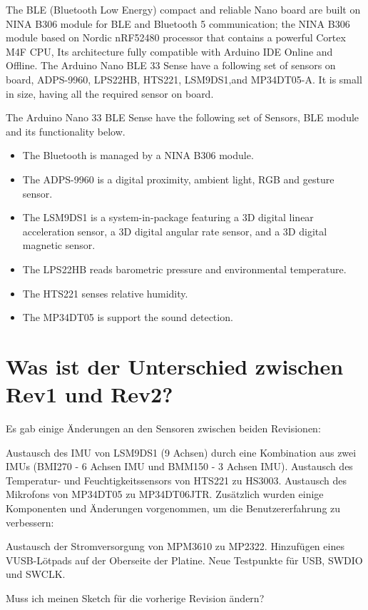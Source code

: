 The BLE (Bluetooth Low Energy) compact and reliable Nano board are built on NINA B306 module for BLE and Bluetooth 5 communication; the NINA B306 module based on Nordic nRF52480 processor that contains a powerful Cortex M4F CPU, Its architecture fully compatible with Arduino IDE Online and Offline. The Arduino Nano BLE 33 Sense have a following set of sensors on board, ADPS-9960, LPS22HB, HTS221, LSM9DS1,and MP34DT05-A. It is small in size, having all the required sensor on board. \cite{Arduino:2021}


The Arduino Nano 33 BLE Sense have the following set of Sensors, BLE module and its functionality below.

\begin{itemize}
    \item The Bluetooth is managed by a NINA B306 module.
    \item The ADPS-9960 is a digital proximity, ambient light, RGB and gesture sensor.
    \item The LSM9DS1 is a system-in-package featuring a 3D digital linear acceleration sensor, a 3D digital angular rate sensor, and a 3D digital magnetic sensor.
    \item The LPS22HB reads barometric pressure and environmental temperature.
    \item The HTS221 senses relative humidity.
    \item The MP34DT05 is support the sound detection.
\end{itemize}


\section{Was ist der Unterschied zwischen Rev1 und Rev2?}

Es gab einige Änderungen an den Sensoren zwischen beiden Revisionen:

Austausch des IMU von LSM9DS1 (9 Achsen) durch eine Kombination aus zwei IMUs (BMI270 - 6 Achsen IMU und BMM150 - 3 Achsen IMU).
Austausch des Temperatur- und Feuchtigkeitssensors von HTS221 zu HS3003.
Austausch des Mikrofons von MP34DT05 zu MP34DT06JTR.
Zusätzlich wurden einige Komponenten und Änderungen vorgenommen, um die Benutzererfahrung zu verbessern:

Austausch der Stromversorgung von MPM3610 zu MP2322.
Hinzufügen eines VUSB-Lötpads auf der Oberseite der Platine.
Neue Testpunkte für USB, SWDIO und SWCLK.


Muss ich meinen Sketch für die vorherige Revision ändern?

